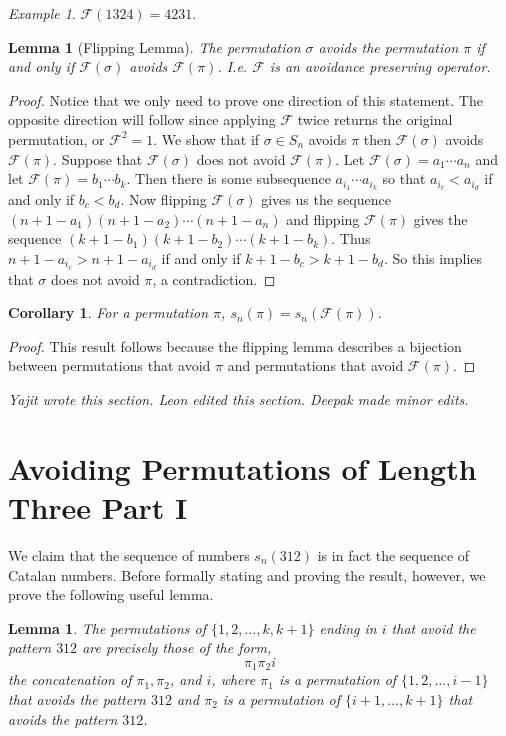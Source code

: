 \documentclass[11pt,letterpaper,twoside,english]{article}
\theoremstyle{theorem}
\newtheorem{corollary}[theorem]{Corollary}
\newtheorem{lemma}[theorem]{Lemma}
\theoremstyle{remark}
\newtheorem{example}[theorem]{Example}
\begin{document}
\begin{example}
$\mathcal{F}(1324)=4231$.
\end{example}


\begin{lemma}[Flipping Lemma]
The permutation $\sigma$ avoids the permutation $\pi$ if and only if $\mathcal{F}(\sigma)$ avoids $\mathcal{F}(\pi)$. I.e. $\mathcal{F}$ is an avoidance preserving operator. 
\end{lemma}
\begin{proof}
Notice that we only need to prove one direction of this statement. The opposite direction will follow since applying $\mathcal{F}$ twice returns the original permutation, or $\mathcal{F}^2 = 1$. We show that if ${\sigma}\in S_n$ avoids $\pi$ then $\mathcal{F}(\sigma)$ avoids $\mathcal{F}(\pi)$. Suppose that $\mathcal{F}(\sigma)$ does not avoid $\mathcal{F}(\pi)$. Let $\mathcal{F}(\sigma)=a_1\cdots a_n$ and let $\mathcal{F}(\pi)=b_1\cdots  b_k$. Then there is some subsequence $a_{i_1}\cdots a_{i_k}$ so that $a_{i_c}<a_{i_d}$ if and only if $b_c<b_d$. Now flipping $\mathcal{F}(\sigma)$ gives us the sequence $(n+1-a_1)(n+1-a_2)\cdots(n+1-a_n)$ and flipping $\mathcal{F}(\pi)$ gives the sequence $(k+1-b_1)(k+1-b_2)\cdots(k+1-b_k)$. Thus $n+1-a_{i_c}>n+1-a_{i_d}$ if and only if $k+1-b_c>k+1-b_d$. So  this implies that $\sigma$ does not avoid $\pi$, a contradiction. 
\end{proof}

\begin{corollary} 
For a permutation $\pi$, $s_n(\pi)=s_n(\mathcal{F}(\pi))$. 
\end{corollary}
\begin{proof}
This result follows because the flipping lemma describes a bijection between permutations that avoid $\pi$ and permutations that avoid $\mathcal{F}(\pi)$. 
\end{proof}

\emph{Yajit wrote this section. Leon edited this section. Deepak made minor edits.}


\section{Avoiding Permutations of Length Three Part I}
\label{312}

We claim that the sequence of numbers $s_n(312)$ is in fact the sequence of Catalan numbers. Before formally stating and proving the result, however, we prove the following useful lemma.
\begin{lemma}
\label{lemma1}
The permutations of $\{1,2,\dots,k,k+1\}$ ending in $i$ that avoid the pattern $312$ are precisely those of the form,
$$\pi_1 \pi_2 i$$
the concatenation of $\pi_1, \pi_2$, and $i$, where $\pi_1$ is a permutation of $\{1,2,\ldots,i-1\}$ that avoids the pattern $312$ and $\pi_2$ is a permutation of $\{i+1,\ldots,k+1\}$ that avoids the pattern $312$.
\end{lemma}
\end{document}
